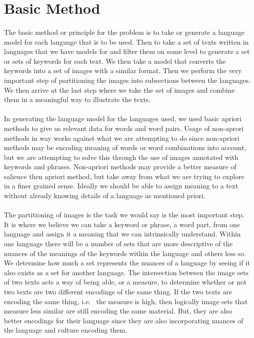 \documentclass[12pt]{article}
\begin{document}
\section{Basic Method}

\paragraph{}
The basic method or principle for the problem is to take or generate a language model for
each language that is to be used. Then to take a set of texts written in languages that we
have models for and filter them on some level to generate a set or sets of keywords for each
text. We then take a model that converts the keywords into a set of images with a similar
format. Then we perform the very important step of partitioning the images into subsections
between the languages. We then arrive at the last step where we take the set of images and
combine them in a meaningful way to illustrate the texts.

\paragraph{}
In generating the language model for the languages used, we used basic apriori methods to
give us relevant data for words and word pairs. Usage of non-aprori methods in way works
against what we are attempting to do since non-apriori methods may be encoding meaning
of words or word combinations into account, but we are attempting to solve this through
the use of images annotated with keywords and phrases. Non-apriori methods may provide
a better measure of salience then apriori method, but take away from what we are trying
to explore in a finer grained sense. Ideally we should be able to assign meaning to a text
without already knowing details of a language as mentioned priori.

\paragraph{}
The partitioning of images is the task we would say is the most important step. It is where
we believe we can take a keyword or phrase, a word part, from one language and assign it a 
meaning that we can intrinsically understand. Within one language there will be a number of
sets that are more descriptive of the nuances of the meanings of the keywords within the
language and others less so. We determine how much a set represents the nuances of a 
language by seeing if it also exists as a set for another language. The intersection between
the image sets of two texts acts a way of being able, or a measure, to determine whether or 
not two texts are two different encodings of the same thing. If the two texts are encoding 
the same thing, i.e. \ the measure is high, then logically image sets that measure less similar
are still encoding the same material. But, they are also better encodings for their language
since they are also incorporating nuances of the language and culture encoding them.
\end{document}
